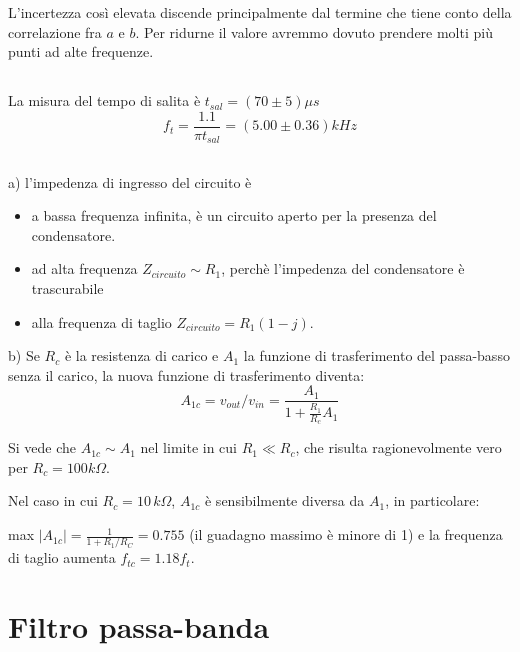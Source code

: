 \documentclass[10pt,a4paper]{article}
\begin{document}
L'incertezza così elevata discende principalmente dal termine che tiene conto della  correlazione fra $a$ e $b$. Per ridurne il valore avremmo dovuto prendere molti più punti ad alte frequenze.

\clearpage


\subsection{}

La misura del tempo di salita è $ t_{sal} = (70\pm 5)\mu s$
\[ f_t = \frac{1.1}{\pi t_{sal}} = (5.00 \pm 0.36) kHz \]

\subsection{}
a) l'impedenza di ingresso del circuito è
\begin{itemize}

\item a bassa frequenza  infinita, è un circuito aperto per la presenza del condensatore.
\item ad alta frequenza $Z_{circuito}\sim R_1$, perchè l'impedenza del condensatore è trascurabile
\item alla frequenza di taglio  $Z_{circuito} = R_1(1-j)$.

\end{itemize}


\vspace{0.5cm}

b)  Se $R_c$ è la resistenza di carico e $A_1$ la funzione di trasferimento del passa-basso senza il carico,  la nuova funzione di trasferimento diventa:
\[ A_{1c} = v_{out}/v_{in}= \frac{A_1}{1+\frac{R_1}{R_c}A_1}\]

Si vede che $A_{1c} \sim A_{1}$ nel limite in cui $R_1 \ll R_c$, che risulta ragionevolmente vero per $R_c = 100 k\Omega$.

Nel caso in cui $R_c = 10 \, k\Omega$, $A_{1c}$ è sensibilmente diversa da $A_1$, in particolare: 

max $|A_{1c}|= \frac{1}{1+R_1/R_C}=0.755$ (il guadagno massimo è minore di 1) e la frequenza di taglio  aumenta $f_{tc}= 1.18 f_{t}$.

\section{Filtro passa-banda}
\subsection{}
\end{document}
